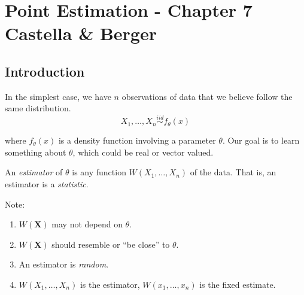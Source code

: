 \documentclass[11pt,fleqn]{book} %
\begin{document}
\pagestyle{empty} %

\tableofcontents %

\cleardoublepage %

\pagestyle{fancy} %



\chapter{Point Estimation - Chapter 7 Castella \& Berger}

\section{Introduction}

In the simplest case, we have $n$ observations of data that we believe follow the same distribution.
$$
	X_1, \dots, X_n \stackrel{iid}{\sim} f_\theta(x)
$$

where $f_\theta(x)$ is a density function involving a parameter $\theta$. Our goal is to learn something about $\theta$, which could be real or vector valued.\\

\begin{definition}[Estimator]
	An \emph{estimator} of $\theta$ is any function $W(X_1, \dots, X_n)$ of the data. That is, an estimator is a \emph{statistic}.
\end{definition}

Note:
\begin{enumerate}
	\item $W(\bm{X})$ may not depend on $\theta$.
	\item $W(\bm{X})$ should resemble or ``be close'' to $\theta$.
	\item An estimator is \emph{random}.
	\item $W(X_1, \dots, X_n)$ is the estimator, $W(x_1, \dots, x_n)$ is the fixed estimate.
\end{enumerate}
\end{document}
